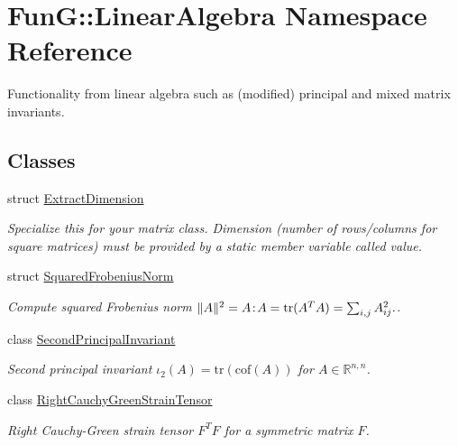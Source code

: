 \hypertarget{namespaceFunG_1_1LinearAlgebra}{\section{Fun\-G\-:\-:Linear\-Algebra Namespace Reference}
\label{namespaceFunG_1_1LinearAlgebra}
}


Functionality from linear algebra such as (modified) principal and mixed matrix invariants.  


\subsection*{Classes}
\begin{DoxyCompactItemize}
\item 
struct \hyperlink{structFunG_1_1LinearAlgebra_1_1ExtractDimension}{Extract\-Dimension}
\begin{DoxyCompactList}\small\item\em Specialize this for your matrix class. Dimension (number of rows/columns for square matrices) must be provided by a static member variable called value. \end{DoxyCompactList}\item 
struct \hyperlink{structFunG_1_1LinearAlgebra_1_1SquaredFrobeniusNorm}{Squared\-Frobenius\-Norm}
\begin{DoxyCompactList}\small\item\em Compute squared Frobenius norm $ \|A\|^2 = A\negthinspace : \negthinspace A = \mathrm{tr}(A^TA) = \sum_{i,j} A_{ij}^2. $. \end{DoxyCompactList}\item 
class \hyperlink{classFunG_1_1LinearAlgebra_1_1SecondPrincipalInvariant}{Second\-Principal\-Invariant}
\begin{DoxyCompactList}\small\item\em Second principal invariant $ \iota_2(A)=\mathrm{tr}(\mathrm{cof}(A)) $ for $A\in\mathbb{R}^{n,n}$. \end{DoxyCompactList}\item 
class \hyperlink{classFunG_1_1LinearAlgebra_1_1RightCauchyGreenStrainTensor}{Right\-Cauchy\-Green\-Strain\-Tensor}
\begin{DoxyCompactList}\small\item\em Right Cauchy-\/\-Green strain tensor $ F^T F $ for a symmetric matrix $ F $. \end{DoxyCompactList}\item 

\end{DoxyCompactItemize}
